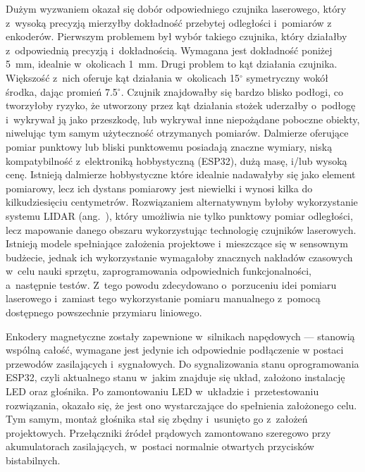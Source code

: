 Dużym wyzwaniem okazał się dobór odpowiedniego czujnika laserowego, który z~wysoką precyzją mierzyłby dokładność przebytej odległości i~pomiarów z enkoderów. Pierwszym problemem był wybór takiego czujnika, który działałby z~odpowiednią precyzją i~dokładnością. Wymagana jest dokładność poniżej 5~mm, idealnie w~okolicach 1~mm. Drugi problem to kąt działania czujnika. Większość z~nich oferuje kąt działania w~okolicach 15$^{\circ}$ symetryczny wokół środka, dając promień 7.5$^{\circ}$. Czujnik znajdowałby się bardzo blisko podłogi, co tworzyłoby ryzyko, że utworzony przez kąt działania stożek uderzałby o~podłogę i~wykrywał ją jako przeszkodę, lub wykrywał inne niepożądane poboczne obiekty, niwelując tym samym użyteczność otrzymanych pomiarów. Dalmierze oferujące pomiar punktowy lub bliski punktowemu posiadają znaczne wymiary, niską kompatybilność z~elektroniką hobbystyczną (ESP32), dużą masę, i/lub wysoką cenę. Istnieją dalmierze hobbystyczne które idealnie nadawałyby się jako element pomiarowy, lecz ich dystans pomiarowy jest niewielki i wynosi kilka do kilkudziesięciu centymetrów. Rozwiązaniem alternatywnym byłoby wykorzystanie systemu LIDAR (ang.~), który umożliwia nie tylko punktowy pomiar odległości, lecz mapowanie danego obszaru wykorzystując technologię czujników laserowych. Istnieją modele spełniające założenia projektowe i~mieszczące się w sensownym budżecie, jednak ich wykorzystanie wymagałoby znacznych nakładów czasowych w~celu nauki sprzętu, zaprogramowania odpowiednich funkcjonalności, a~następnie testów. Z~tego powodu zdecydowano o~porzuceniu idei pomiaru laserowego i~zamiast tego wykorzystanie pomiaru manualnego z~pomocą dostępnego powszechnie przymiaru liniowego.

Enkodery magnetyczne zostały zapewnione w~silnikach napędowych --- stanowią wspólną całość, wymagane jest jedynie ich odpowiednie podłączenie w postaci przewodów zasilających i~sygnałowych. Do sygnalizowania stanu oprogramowania ESP32, czyli aktualnego stanu w~jakim znajduje się układ, założono instalację LED oraz głośnika. Po zamontowaniu LED w~układzie i~przetestowaniu rozwiązania, okazało się, że jest ono wystarczające do spełnienia założonego celu. Tym samym, montaż głośnika stał się zbędny i~usunięto go z~założeń projektowych. Przełączniki źródeł prądowych zamontowano szeregowo przy akumulatorach zasilających, w~postaci normalnie otwartych przycisków bistabilnych.

